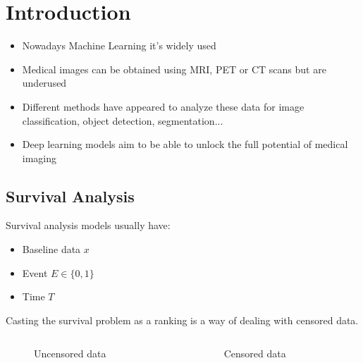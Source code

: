 \section{Introduction}
\begin{frame}{\insertsec}
	\begin{itemize}
    \item Nowadays Machine Learning it's widely used
    \item Medical images can be obtained using MRI, PET or CT scans but are underused
    \item Different methods have appeared to analyze these data for image classification,
    object detection, segmentation...
    \item Deep learning models aim to be able to unlock the full potential of medical imaging
  \end{itemize}
\end{frame}

\subsection{Survival Analysis}
\begin{frame}{\insertsubsec}
  Survival analysis models usually have:
  \begin{itemize}
    \item Baseline data \( x \)
    \item Event \( E \in \{0, 1\} \)
    \item Time \( T \)
  \end{itemize}

  Casting the survival problem as a ranking is a way of dealing with censored data.
  \vspace{.3cm}
  \begin{columns}
    \begin{column}{.5\textwidth}
      \begin{figure}
        \centering
        
        \caption{Uncensored data}
      \end{figure}
    \end{column}
    \begin{column}{.5\textwidth}
      \begin{figure}
        \centering
        
        \caption{Censored data}
      \end{figure}
    \end{column}
  \end{columns}
  
\end{frame}